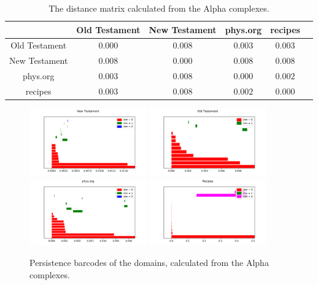 \documentclass[12pt,a4paper]{amsart}
\begin{document}
\begin{table}
  \centering
  \begin{tabular}{c|ccccc}
                  & Old Testament & New Testament & phys.org & recipes \\ \hline
    Old Testament & $0.000$ & $0.008$ & $0.003$ & $0.003$ \\
    New Testament & $0.008$ & $0.000$ & $0.008$ & $0.008$ \\
    phys.org      & $0.003$ & $0.008$ & $0.000$ & $0.002$ \\
    recipes       & $0.003$ & $0.008$ & $0.002$ & $0.000$ \\
  \end{tabular}

  \caption{The distance matrix calculated from the Alpha complexes.}
  \label{tab:alpha}
\end{table}

\begin{figure}
  \centering
  \includegraphics[width=0.45\textwidth]{../plots/barcodes/bible-new-alpha}
  \includegraphics[width=0.45\textwidth]{../plots/barcodes/bible-old-alpha}
  \includegraphics[width=0.45\textwidth]{../plots/barcodes/phys-alpha}
  \includegraphics[width=0.45\textwidth]{../plots/barcodes/recipes-alpha}
  \caption{Persistence barcodes of the domains, calculated from the Alpha
    complexes.}
  \label{fig:barcode:alpha}
\end{figure}
\end{document}
